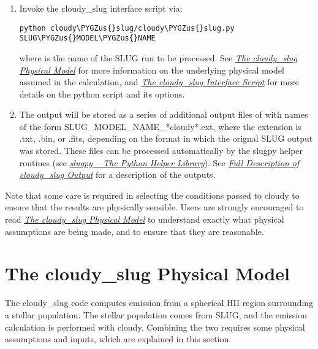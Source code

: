 \documentclass[letterpaper,10pt,english]{sphinxmanual}
\def\PYGZus{\char`\_}
\begin{document}
\begin{enumerate}
\item {} 
Invoke the cloudy\_slug interface script via:

\begin{Verbatim}[commandchars=\\\{\}]
python cloudy\PYGZus{}slug/cloudy\PYGZus{}slug.py SLUG\PYGZus{}MODEL\PYGZus{}NAME
\end{Verbatim}

where  is the name of the SLUG run to be
processed. See {\hyperref[cloudy:ssec\string-cloudy\string-model]{\emph{The cloudy\_slug Physical Model}}} for more information on
the underlying physical model assumed in the calculation, and
{\hyperref[cloudy:ssec\string-cloudy\string-slug\string-options]{\emph{The cloudy\_slug Interface Script}}} for more details on the python
script and its options.

\item {} 
The output will be stored as a series of additional output files of
with names of the form SLUG\_MODEL\_NAME\_*cloudy*.ext, where the
extension is .txt, .bin, or .fits, depending on the format in which
the orignal SLUG output was stored. These files can be processed
automatically by the slugpy helper routines (see
{\hyperref[slugpy:sec\string-slugpy]{\emph{slugpy -- The Python Helper Library}}}). See {\hyperref[cloudy:ssec\string-cloudy\string-output]{\emph{Full Description of cloudy\_slug Output}}} for a description
of the outputs.

\end{enumerate}

Note that some care is required in selecting the conditions passed to
cloudy to ensure that the results are physically sensible. Users are
strongly encouraged to read {\hyperref[cloudy:ssec\string-cloudy\string-model]{\emph{The cloudy\_slug Physical Model}}} to understand
exactly what physical assumptions are being made, and to ensure that
they are reasonable.


\section{The cloudy\_slug Physical Model}
\label{cloudy:ssec-cloudy-model}\label{cloudy:the-cloudy-slug-physical-model}
The cloudy\_slug code computes emission from a spherical HII region
surrounding a stellar population. The stellar population comes from
SLUG, and the emission calculation is performed with cloudy. Combining
the two requires some physical assumptions and inputs, which are
explained in this section.
\end{document}
